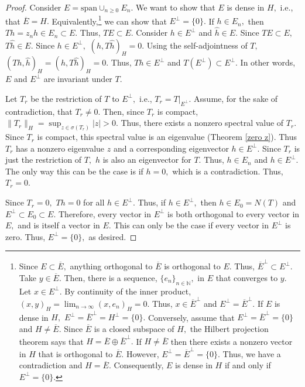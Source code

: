 \documentclass[12pt,a4paper]{article}
\theoremstyle{boldthm}
\theoremstyle{bolddefn}
\begin{document}
\begin{proof}
    Consider $E = \text{span} \cup_{n \ge 0} E_n.$ We want to show that $E$ is dense in $H,$ i.e., that $\overline E = H.$ Equivalently,\footnote{Since $E \subset \overline E,$ anything orthogonal to $\overline E$ is orthogonal to $E.$ Thus, $\overline E^{\perp} \subset E^{\perp}.$ Take $y \in \overline E.$ Then, there is a sequence, $\{e_n\}_{n \in \mathbb{N}},$ in $E$ that converges to $y.$ Let $x \in E^{\perp}.$ By continuity of the inner product, $(x, y)_H = \lim_{n \rightarrow \infty} (x, e_n)_H = 0.$ Thus, $x \in \overline E^{\perp}$ and $E^{\perp} = \overline E^{\perp}.$ If $E$ is dense in $H,$ $E^{\perp} = \overline E^{\perp} = H^{\perp} = \{0\}.$ Conversely, assume that $E^{\perp} = \overline E^{\perp} =\{0\}$ and $H \ne \overline E.$ Since $\overline E$ is a closed subspace of $H,$ the Hilbert projection theorem says that $H = \overline E \oplus \overline E^{\perp}.$ If $H \ne \overline E$ then there exists a nonzero vector in $H$ that is orthogonal to $\overline E.$ However, $E^{\perp} = \overline E^{\perp} =\{0\}.$ Thus, we have a contradiction and $H = \overline E.$ Consequently, $E$ is dense in $H$ if and only if $E^{\perp} = \{0\}.$} we can show that $E^{\perp} = \{0\}.$ If $h \in E_n,$ then $Th = z_n h \in E_n \subset E.$ Thus, $TE \subset E.$ Consider $h \in E^{\perp}$ and $\hat h \in E.$ Since $TE \subset E,$ $T\hat h \in E.$ Since $h \in E^{\perp},$ $(h, T\hat h)_H = 0.$ Using the self-adjointness of $T,$ $(Th, \hat h)_H = (h, T \hat h)_H = 0.$ Thus, $Th \in E^{\perp}$ and $T(E^{\perp}) \subset E^{\perp}.$ In other words, $E$ and $E^{\perp}$ are invariant under $T.$

    Let $T_r$ be the restriction of $T$ to $E^{\perp},$ i.e., $T_r = T |_{E^{\perp}}.$ Assume, for the sake of contradiction, that $T_r \ne 0.$ Then, since $T_r$ is compact, $\| T_r \|_H = \sup_{z \in \sigma(T_r)} |z| > 0.$ Thus, there exists a nonzero spectral value of $T_r.$ Since $T_r$ is compact, this spectral value is an eigenvalue (Theorem \ref{zero z}). Thus $T_r$ has a nonzero eigenvalue $z$ and a corresponding eigenvector $h \in E^{\perp}.$ Since $T_r$ is just the restriction of $T,$ $h$ is also an eigenvector for $T.$ Thus, $h \in E_n$ and $h \in E^{\perp}.$ The only way this can be the case is if $h=0,$ which is a contradiction. Thus, $T_r = 0. $

    Since $T_r =0,$ $Th=0$ for all $h \in E^{\perp}.$ Thus, if $h \in E^{\perp},$ then $h \in E_0 = N(T)$ and $E^{\perp} \subset E_0 \subset E.$ Therefore, every vector in $E^{\perp}$ is both orthogonal to every vector in $E,$ and is itself a vector in $E.$ This can only be the case if every vector in $E^{\perp}$ is zero. Thus, $E^{\perp} = \{0\},$ as desired.


\end{proof}
\end{document}
